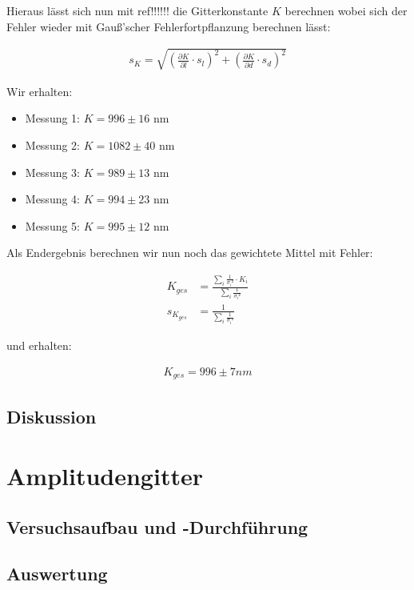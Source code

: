 \documentclass[12pt]{article}
\newcommand{\del}[2][]{\frac{\partial #1}{\partial #2}}
\begin{document}
Hieraus lässt sich nun mit ref!!!!!! die Gitterkonstante $K$ berechnen wobei sich der Fehler wieder mit Gauß'scher Fehlerfortpflanzung berechnen lässt:

\begin{align*}
s_K = \sqrt{\left(\del[K]{l}\cdot s_{l}\right)^2+\left(\del[K]{d}\cdot s_{d}\right)^2}
\end{align*}

Wir erhalten:

\begin{itemize}
\item Messung 1: $K = 996 \pm 16$ nm
\item Messung 2: $K = 1082 \pm 40$ nm
\item Messung 3: $K = 989 \pm 13$ nm
\item Messung 4: $K = 994 \pm 23$ nm
\item Messung 5: $K = 995 \pm 12$ nm
\end{itemize}

Als Endergebnis berechnen wir nun noch das gewichtete Mittel mit Fehler:

\begin{align*}
K_{ges} &=\frac{\sum\limits_i \frac{1}{\sigma_i²} \cdot K_i}{\sum\limits_i \frac{1}{\sigma_i²}}\\
s_{K_{ges}} &= \frac{1}{\sum\limits_i \frac{1}{\sigma_i²}}
\end{align*}

und erhalten:

\begin{align*}
K_{ges} = 996 \pm 7 nm
\end{align*}

\newpage
\subsection{Diskussion}

\newpage
\section{Amplitudengitter}

\newpage
\subsection{Versuchsaufbau und -Durchführung}





\newpage
\subsection{Auswertung}
\end{document}
